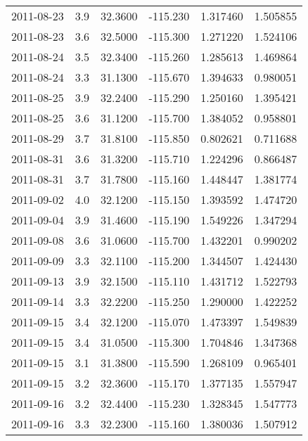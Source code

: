 \begin{tabular}{lrrrrr}
2011-08-23 &       3.9 &  32.3600 &  -115.230 &         1.317460 &         1.505855 \\
2011-08-23 &       3.6 &  32.5000 &  -115.300 &         1.271220 &         1.524106 \\
2011-08-24 &       3.5 &  32.3400 &  -115.260 &         1.285613 &         1.469864 \\
2011-08-24 &       3.3 &  31.1300 &  -115.670 &         1.394633 &         0.980051 \\
2011-08-25 &       3.9 &  32.2400 &  -115.290 &         1.250160 &         1.395421 \\
2011-08-25 &       3.6 &  31.1200 &  -115.700 &         1.384052 &         0.958801 \\
2011-08-29 &       3.7 &  31.8100 &  -115.850 &         0.802621 &         0.711688 \\
2011-08-31 &       3.6 &  31.3200 &  -115.710 &         1.224296 &         0.866487 \\
2011-08-31 &       3.7 &  31.7800 &  -115.160 &         1.448447 &         1.381774 \\
2011-09-02 &       4.0 &  32.1200 &  -115.150 &         1.393592 &         1.474720 \\
2011-09-04 &       3.9 &  31.4600 &  -115.190 &         1.549226 &         1.347294 \\
2011-09-08 &       3.6 &  31.0600 &  -115.700 &         1.432201 &         0.990202 \\
2011-09-09 &       3.3 &  32.1100 &  -115.200 &         1.344507 &         1.424430 \\
2011-09-13 &       3.9 &  32.1500 &  -115.110 &         1.431712 &         1.522793 \\
2011-09-14 &       3.3 &  32.2200 &  -115.250 &         1.290000 &         1.422252 \\
2011-09-15 &       3.4 &  32.1200 &  -115.070 &         1.473397 &         1.549839 \\
2011-09-15 &       3.4 &  31.0500 &  -115.300 &         1.704846 &         1.347368 \\
2011-09-15 &       3.1 &  31.3800 &  -115.590 &         1.268109 &         0.965401 \\
2011-09-15 &       3.2 &  32.3600 &  -115.170 &         1.377135 &         1.557947 \\
2011-09-16 &       3.2 &  32.4400 &  -115.230 &         1.328345 &         1.547773 \\
2011-09-16 &       3.3 &  32.2300 &  -115.160 &         1.380036 &         1.507912 \\

\end{tabular}
